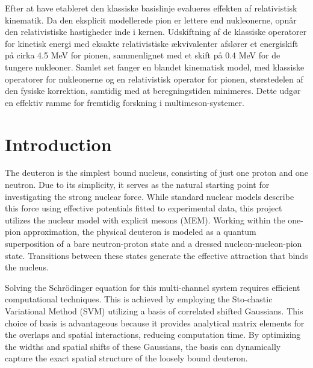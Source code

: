 \documentclass[a4paper,oneside,article,12pt]{memoir}
\begin{document}
Efter at have etableret den klassiske basislinje evalueres effekten af relativistisk kinematik. Da den eksplicit modellerede pion er lettere end nukleonerne, opnår den relativistiske hastigheder inde i kernen. Udskiftning af de klassiske operatorer for kinetisk energi med eksakte relativistiske ækvivalenter afslører et energiskift på cirka 4.5 MeV for pionen, sammenlignet med et skift på 0.4 MeV for de tungere nukleoner. Samlet set fanger en blandet kinematisk model, med klassiske operatorer for nukleonerne og en relativistisk operator for pionen, størstedelen af den fysiske korrektion, samtidig med at beregningstiden minimeres. Dette udgør en effektiv ramme for fremtidig forskning i multimeson-systemer.
\newpage
\begingroup
\pagestyle{empty}
\setcounter{tocdepth}{2}
\setcounter{secnumdepth}{1}
\hypersetup{linkcolor=black} %
\tableofcontents* %
\pagestyle{empty}
\hypersetup{linkcolor=red} %
\clearpage
\endgroup

\newpage
\pagestyle{plain}
\setcounter{page}{1}
\chapter{Introduction}
The deuteron is the simplest bound nucleus, consisting of just one proton and one neutron. Due to its simplicity, it serves as the natural starting point for investigating the strong nuclear force. While standard nuclear models describe this force using effective potentials fitted to experimental data, this project utilizes the nuclear model with explicit mesons (MEM). Working within the one-pion approximation, the physical deuteron is modeled as a quantum superposition of a bare neutron-proton state and a dressed nucleon-nucleon-pion state. Transitions between these states generate the effective attraction that binds the nucleus.

Solving the Schrödinger equation for this multi-channel system requires efficient computational techniques. 
This is achieved by employing the Sto-chastic Variational Method (SVM) utilizing a basis of correlated shifted Gaussians. This choice of basis is advantageous because it provides analytical matrix elements for the overlaps and spatial interactions, reducing computation time. 
By optimizing the widths and spatial shifts of these Gaussians, the basis can dynamically capture the exact spatial structure of the loosely bound deuteron.
\end{document}
